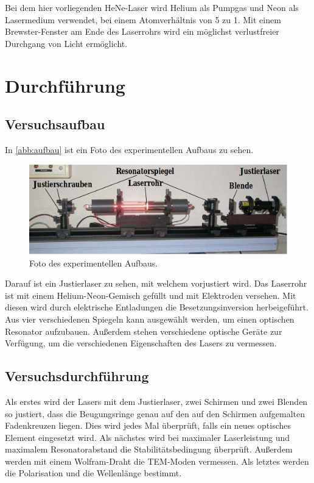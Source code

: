 Bei dem hier vorliegenden HeNe-Laser wird Helium als Pumpgas und Neon als Lasermedium
verwendet, bei einem Atomverhältnis von 5 zu 1. Mit einem Brewster-Fenster am Ende
des Laserrohrs wird ein möglichst verlustfreier Durchgang von Licht ermöglicht.

\section{Durchführung}
\subsection{Versuchsaufbau}
In \autoref{abb:aufbau} ist ein Foto des experimentellen Aufbaus zu sehen.
\begin{figure}
  \centering
  \includegraphics[scale=0.4]{content/pics/aufbau.png}
  \caption{Foto des experimentellen Aufbaus.}
  \label{abb:aufbau}
\end{figure}
Darauf ist ein Justierlaser zu sehen, mit welchem vorjustiert wird. Das Laserrohr
ist mit einem Helium-Neon-Gemisch gefüllt und mit Elektroden versehen. Mit diesen
wird durch elektrische Entladungen die Besetzungsinversion herbeigeführt. Aus vier
verschiedenen Spiegeln kann ausgewählt werden, um einen optischen Resonator aufzubauen.
Außerdem stehen verschiedene optische Geräte zur Verfügung, um die verschiedenen
Eigenschaften des Lasers zu vermessen.

\subsection{Versuchsdurchführung}
Als erstes wird der Lasers mit dem Justierlaser, zwei Schirmen und zwei Blenden
so justiert, dass die Beugungsringe genau auf den auf den Schirmen aufgemalten
Fadenkreuzen liegen. Dies wird jedes Mal überprüft, falls ein neues optisches Element
eingesetzt wird. Als nächstes wird bei maximaler Laserleistung und maximalem Resonatorabstand
die Stabilitätsbedingung überprüft. Außerdem werden mit einem Wolfram-Draht die
TEM-Moden vermessen. Als letztes werden die Polarisation und die Wellenlänge bestimmt. 
